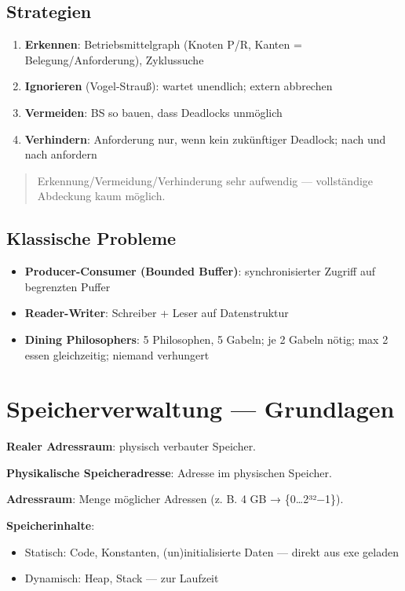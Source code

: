 \documentclass[11pt, a4paper]{article}
\begin{document}
\subsection{Strategien}
\begin{enumerate}
  \item \textbf{Erkennen}: Betriebsmittelgraph (Knoten P/R, Kanten = Belegung/Anforderung), Zyklussuche
  \item \textbf{Ignorieren} (Vogel-Strauß): wartet unendlich; extern abbrechen
  \item \textbf{Vermeiden}: BS so bauen, dass Deadlocks unmöglich
  \item \textbf{Verhindern}: Anforderung nur, wenn kein zukünftiger Deadlock; nach und nach anfordern
\end{enumerate}

\begin{quote}
Erkennung/Vermeidung/Verhinderung sehr aufwendig — vollständige Abdeckung kaum möglich.
\end{quote}


\subsection{Klassische Probleme}
\begin{itemize}
  \item \textbf{Producer-Consumer (Bounded Buffer)}: synchronisierter Zugriff auf begrenzten Puffer
  \item \textbf{Reader-Writer}: Schreiber + Leser auf Datenstruktur
  \item \textbf{Dining Philosophers}: 5 Philosophen, 5 Gabeln; je 2 Gabeln nötig; max 2 essen gleichzeitig; niemand verhungert
\end{itemize}


\section{Speicherverwaltung — Grundlagen}

\textbf{Realer Adressraum}: physisch verbauter Speicher.


\textbf{Physikalische Speicheradresse}: Adresse im physischen Speicher.


\textbf{Adressraum}: Menge möglicher Adressen (z. B. 4 GB → \{0…2³²−1\}).


\textbf{Speicherinhalte}:

\begin{itemize}
  \item Statisch: Code, Konstanten, (un)initialisierte Daten — direkt aus exe geladen
  \item Dynamisch: Heap, Stack — zur Laufzeit
\end{itemize}
\end{document}
